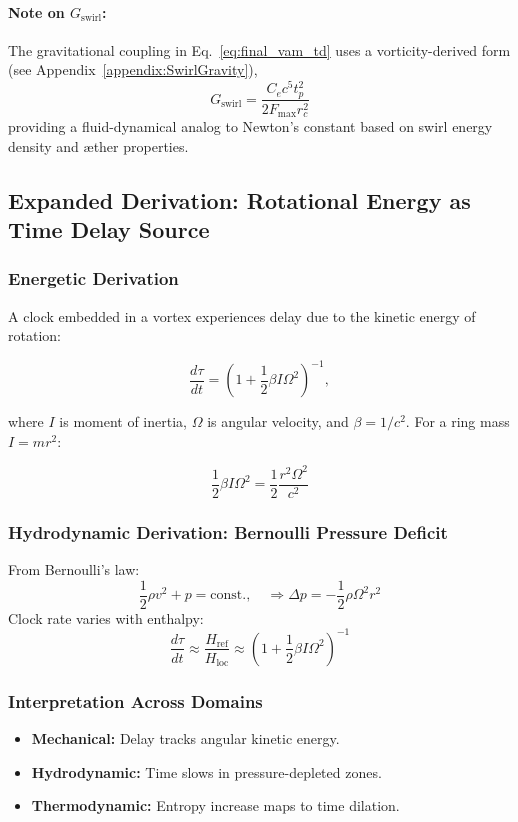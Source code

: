 \paragraph{Note on $G_\text{swirl}$:}
The gravitational coupling in Eq.~\eqref{eq:final_vam_td} uses a vorticity-derived form (see Appendix~\ref{appendix:SwirlGravity}),
\[
    G_\text{swirl} = \frac{C_e c^5 t_p^2}{2 F_{\text{max}} r_c^2}
\]
providing a fluid-dynamical analog to Newton's constant based on swirl energy density and æther properties.


\subsection{Expanded Derivation: Rotational Energy as Time Delay Source}

\subsubsection{Energetic Derivation}

A clock embedded in a vortex experiences delay due to the kinetic energy of rotation:

\begin{equation}
    \frac{d\tau}{dt} = \left(1 + \frac{1}{2} \beta I \Omega^2 \right)^{-1},
\end{equation}

where $I$ is moment of inertia, $\Omega$ is angular velocity, and $\beta = 1/c^2$. For a ring mass $I = m r^2$:

\[
    \frac{1}{2} \beta I \Omega^2 = \frac{1}{2} \frac{r^2 \Omega^2}{c^2}
\]

\subsubsection{Hydrodynamic Derivation: Bernoulli Pressure Deficit}

From Bernoulli's law:
\[
    \frac{1}{2} \rho v^2 + p = \text{const.}, \quad \Rightarrow \Delta p = -\frac{1}{2} \rho \Omega^2 r^2
\]
Clock rate varies with enthalpy:
\[
    \frac{d\tau}{dt} \approx \frac{H_\text{ref}}{H_\text{loc}} \approx \left(1 + \frac{1}{2} \beta I \Omega^2 \right)^{-1}
\]

\subsubsection{Interpretation Across Domains}
\begin{itemize}
    \item \textbf{Mechanical:} Delay tracks angular kinetic energy.
    \item \textbf{Hydrodynamic:} Time slows in pressure-depleted zones.
    \item \textbf{Thermodynamic:} Entropy increase maps to time dilation.
\end{itemize}

